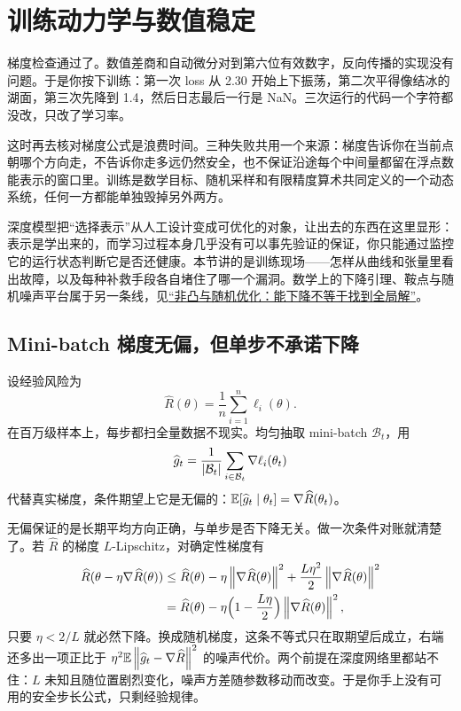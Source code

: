\section{训练动力学与数值稳定}
\label{sec:14-Deep-Learning/03-Optimization-and-Training/01}

梯度检查通过了。数值差商和自动微分对到第六位有效数字，反向传播的实现没有问题。于是你按下训练：第一次 loss 从 2.30 开始上下振荡，第二次平得像结冰的湖面，第三次先降到 1.4，然后日志最后一行是 NaN。三次运行的代码一个字符都没改，只改了学习率。

这时再去核对梯度公式是浪费时间。三种失败共用一个来源：梯度告诉你在当前点朝哪个方向走，不告诉你走多远仍然安全，也不保证沿途每个中间量都留在浮点数能表示的窗口里。训练是数学目标、随机采样和有限精度算术共同定义的一个动态系统，任何一方都能单独毁掉另外两方。

深度模型把``选择表示''从人工设计变成可优化的对象，让出去的东西在这里显形：表示是学出来的，而学习过程本身几乎没有可以事先验证的保证，你只能通过监控它的运行状态判断它是否还健康。本节讲的是训练现场——怎样从曲线和张量里看出故障，以及每种补救手段各自堵住了哪一个漏洞。数学上的下降引理、鞍点与随机噪声平台属于另一条线，见\hyperref[ch:078]{``非凸与随机优化：能下降不等于找到全局解''}。

\subsection{Mini-batch 梯度无偏，但单步不承诺下降}

设经验风险为
\[
\widehat R(\theta)=\frac1n\sum_{i=1}^n\ell_i(\theta).
\]
在百万级样本上，每步都扫全量数据不现实。均匀抽取 mini-batch \(\mathcal B_t\)，用
\[
\widehat g_t=\frac1{\left|\mathcal B_t\right|}\sum_{i\in\mathcal B_t}\nabla\ell_i(\theta_t)
\]
代替真实梯度，条件期望上它是无偏的：\(\mathbb{E}[\widehat g_t\mid\theta_t]=\nabla\widehat R(\theta_t)\)。

无偏保证的是长期平均方向正确，与单步是否下降无关。做一次条件对账就清楚了。若 \(\widehat R\) 的梯度 \(L\)-Lipschitz，对确定性梯度有
\[
\begin{aligned}
\widehat R(\theta-\eta\nabla\widehat R(\theta))
&\le \widehat R(\theta)-\eta\left\lVert\nabla\widehat R(\theta)\right\rVert^2+\frac{L\eta^2}{2}\left\lVert\nabla\widehat R(\theta)\right\rVert^2\\
&=\widehat R(\theta)-\eta\Bigl(1-\frac{L\eta}{2}\Bigr)\left\lVert\nabla\widehat R(\theta)\right\rVert^2,
\end{aligned}
\]
只要 \(\eta<2/L\) 就必然下降。换成随机梯度，这条不等式只在取期望后成立，右端还多出一项正比于 \(\eta^2\mathbb{E}\left\lVert\widehat g_t-\nabla\widehat R\right\rVert^2\) 的噪声代价。两个前提在深度网络里都站不住：\(L\) 未知且随位置剧烈变化，噪声方差随参数移动而改变。于是你手上没有可用的安全步长公式，只剩经验规律。

